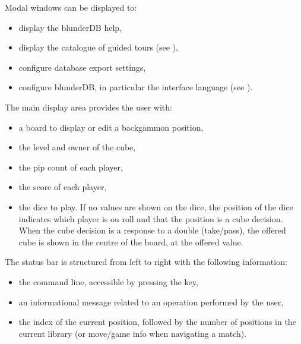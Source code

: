 \documentclass[letterpaper,10pt,english]{sphinxmanual}
\begin{document}
\sphinxAtStartPar
Modal windows can be displayed to:
\begin{itemize}
\item {} 
\sphinxAtStartPar
display the blunderDB help,

\item {} 
\sphinxAtStartPar
display the catalogue of guided tours (see {\hyperref[\detokenize{manuel:visites-guidees}]{}}),

\item {} 
\sphinxAtStartPar
configure database export settings,

\item {} 
\sphinxAtStartPar
configure blunderDB, in particular the interface language (see {\hyperref[\detokenize{manuel:configuration}]{}}).

\end{itemize}

\sphinxAtStartPar
The main display area provides the user with:
\begin{itemize}
\item {} 
\sphinxAtStartPar
a board to display or edit a backgammon position,

\item {} 
\sphinxAtStartPar
the level and owner of the cube,

\item {} 
\sphinxAtStartPar
the pip count of each player,

\item {} 
\sphinxAtStartPar
the score of each player,

\item {} 
\sphinxAtStartPar
the dice to play. If no values are shown on the dice, the position of the dice indicates which player is on roll and that the position is a cube decision. When the cube decision is a response to a double (take/pass), the offered cube is shown in the centre of the board, at the offered value.

\end{itemize}

\sphinxAtStartPar
The status bar is structured from left to right with the following information:
\begin{itemize}
\item {} 
\sphinxAtStartPar
the command line, accessible by pressing the  key,

\item {} 
\sphinxAtStartPar
an informational message related to an operation performed by the user,

\item {} 
\sphinxAtStartPar
the index of the current position, followed by the number of positions in the current library (or move/game info when navigating a match).

\end{itemize}
\end{document}
